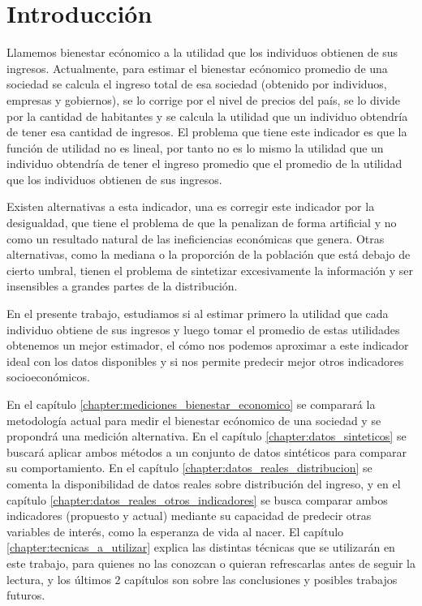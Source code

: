 \chapter{Introducción}

Llamemos bienestar ecónomico a la utilidad que los individuos obtienen de sus ingresos. Actualmente, para estimar el bienestar ecónomico promedio de una sociedad se calcula el ingreso total de esa sociedad (obtenido por individuos, empresas y gobiernos), se lo corrige por el nivel de precios del país, se lo divide por la cantidad de habitantes y se calcula la utilidad que un individuo obtendría de tener esa cantidad de ingresos. El problema que tiene este indicador es que la función de utilidad no es lineal, por tanto no es lo mismo la utilidad que un individuo obtendría de tener el ingreso promedio que el promedio de la utilidad que los individuos obtienen de sus ingresos. 

Existen alternativas a esta indicador, una es corregir este indicador por la desigualdad, que tiene el problema de que la penalizan de forma artificial y no como un resultado natural de las ineficiencias económicas que genera. Otras alternativas, como la mediana o la proporción de la población que está debajo de cierto umbral, tienen el problema de sintetizar excesivamente la información y ser insensibles a grandes partes de la distribución.

En el presente trabajo, estudiamos si al estimar primero la utilidad que cada individuo obtiene de sus ingresos y luego tomar el promedio de estas utilidades obtenemos un mejor estimador, el cómo nos podemos aproximar a este indicador ideal con los datos disponibles y si nos permite predecir mejor otros indicadores socioeconómicos.

En el capítulo \ref{chapter:mediciones_bienestar_economico} se comparará la metodología actual para medir el bienestar ecónomico de una sociedad y se propondrá una medición alternativa. En el capítulo \ref{chapter:datos_sinteticos} se buscará aplicar ambos métodos a un conjunto de datos sintéticos para comparar su comportamiento. En el capítulo \ref{chapter:datos_reales_distribucion} se comenta la disponibilidad de datos reales sobre distribución del ingreso, y en el capítulo \ref{chapter:datos_reales_otros_indicadores} se busca comparar ambos indicadores (propuesto y actual) mediante su capacidad de predecir otras variables de interés, como la esperanza de vida al nacer. El capítulo \ref{chapter:tecnicas_a_utilizar} explica las distintas técnicas que se utilizarán en este trabajo, para quienes no las conozcan o quieran refrescarlas antes de seguir la lectura, y los últimos 2 capítulos son sobre las conclusiones y posibles trabajos futuros.

